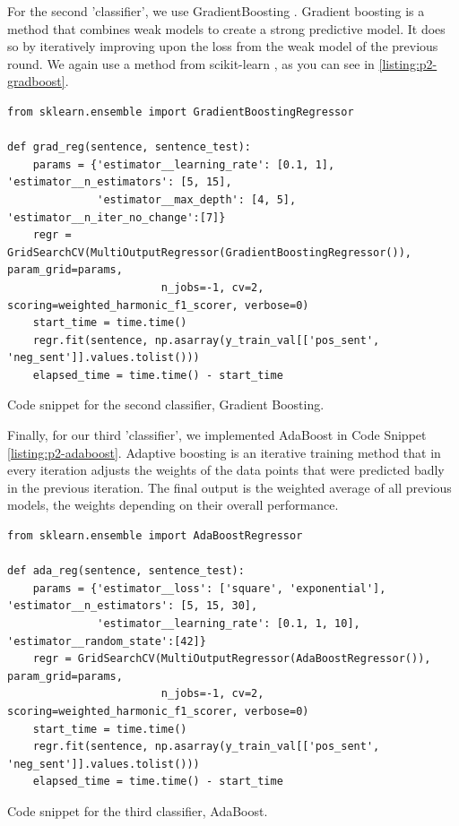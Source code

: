 For the second 'classifier', we use GradientBoosting \cite{gradboost1, gradboost2, gradboost3}. Gradient boosting is a method that combines weak models to create a strong predictive model. It does so by iteratively improving upon the loss from the weak model of the previous round.
We again use a method from scikit-learn \cite{sklearn1, sklearn2}, as you can see in \ref{listing:p2-gradboost}.

\begin{listing*}
\begin{verbatim}
from sklearn.ensemble import GradientBoostingRegressor

def grad_reg(sentence, sentence_test):
    params = {'estimator__learning_rate': [0.1, 1], 'estimator__n_estimators': [5, 15],
              'estimator__max_depth': [4, 5], 'estimator__n_iter_no_change':[7]}
    regr = GridSearchCV(MultiOutputRegressor(GradientBoostingRegressor()), param_grid=params,
                        n_jobs=-1, cv=2, scoring=weighted_harmonic_f1_scorer, verbose=0)
    start_time = time.time()
    regr.fit(sentence, np.asarray(y_train_val[['pos_sent', 'neg_sent']].values.tolist()))
    elapsed_time = time.time() - start_time
\end{verbatim}
\caption{Code snippet for the second classifier, Gradient Boosting.}
\label{listing:p2-gradboost}
\end{listing*}

Finally, for our third 'classifier', we implemented AdaBoost \cite{adaboost} in Code Snippet \ref{listing:p2-adaboost}. Adaptive boosting is an iterative training method that in every iteration adjusts the weights of  the data points that were predicted badly in the previous iteration. The final output is the weighted average of all previous models, the weights depending on their overall performance.

\begin{listing*}
\begin{verbatim}
from sklearn.ensemble import AdaBoostRegressor

def ada_reg(sentence, sentence_test):
    params = {'estimator__loss': ['square', 'exponential'], 'estimator__n_estimators': [5, 15, 30],
              'estimator__learning_rate': [0.1, 1, 10], 'estimator__random_state':[42]}
    regr = GridSearchCV(MultiOutputRegressor(AdaBoostRegressor()), param_grid=params,
                        n_jobs=-1, cv=2, scoring=weighted_harmonic_f1_scorer, verbose=0)
    start_time = time.time()
    regr.fit(sentence, np.asarray(y_train_val[['pos_sent', 'neg_sent']].values.tolist()))
    elapsed_time = time.time() - start_time
\end{verbatim}
\caption{Code snippet for the third classifier, AdaBoost.}
\label{listing:p2-adaboost}
\end{listing*}

